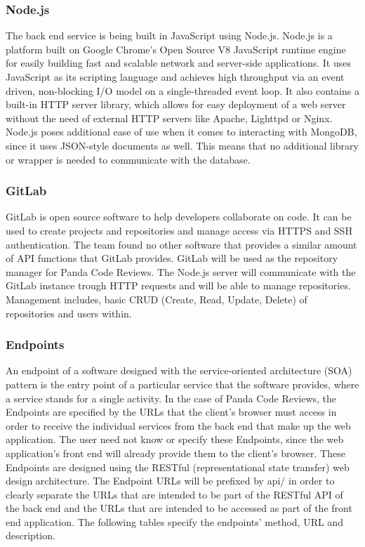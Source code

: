 \subsubsection{Node.js}

The back end service is being built in JavaScript using Node.js\cite{nodejs}.
Node.js is a platform built on Google Chrome's Open Source V8 JavaScript runtime
engine for easily building fast and scalable network and server-side
applications. It uses JavaScript as its scripting language and achieves high
throughput via an event driven, non-blocking I/O model on a single-threaded
event loop. It also contains a built-in HTTP server library, which allows for
easy deployment of a web server without the need of external HTTP servers like
Apache, Lighttpd or Nginx. Node.js poses additional ease of use when it comes to
interacting with MongoDB, since it uses JSON-style documents as well. This means
that no additional library or wrapper is needed to communicate with the
database.

\subsubsection{GitLab}

GitLab\cite{gitlab} is open source software to help developers collaborate on
code. It can be used to create projects and repositories and manage access via
HTTPS and SSH authentication. The team found no other software that provides a
similar amount of API functions that GitLab provides. GitLab will be used as the
repository manager for Panda Code Reviews. The Node.js server will communicate
with the GitLab instance trough HTTP requests and will be able to manage
repositories. Management includes, basic CRUD (Create, Read, Update, Delete) of
repositories and users within.

\subsubsection{Endpoints}

An endpoint of a software designed with the service-oriented architecture (SOA)
pattern is the entry point of a particular service that the software provides,
where a service stands for a single activity. In the case of Panda Code Reviews,
the Endpoints are specified by the URLs that the client's browser must access in
order to receive the individual services from the back end that make up the web
application. The user need not know or specify these Endpoints, since the web
application's front end will already provide them to the client's browser. These
Endpoints are designed using the RESTful (representational state transfer) web
design architecture. The Endpoint URLs will be prefixed by api/ in order to
clearly separate the URLs that are intended to be part of the RESTful API of the
back end and the URLs that are intended to be accessed as part of the front end
application. The following tables specify the endpoints' method, URL and
description.

